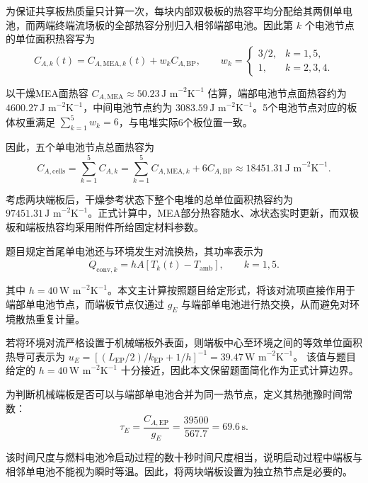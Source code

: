 \documentclass[bwprint]{gmcmthesis}
\numberwithin{figure}{section}
\begin{document}
\begin{itemize}
\noindent 为保证共享板热质量只计算一次，每块内部双极板的热容平均分配给其两侧单电池，而两端终端流场板的全部热容分别归入相邻端部电池。因此第 \(k\) 个电池节点的单位面积热容写为
\begin{equation}
C_{A,k}(t) = C_{A,\text{MEA},k}(t) + w_k C_{A,\text{BP}}, \qquad w_k = \begin{cases} 3/2, & k = 1, 5, \\ 1, & k = 2, 3, 4. \end{cases} \tag{5-20}
\end{equation}

\noindent 以干燥MEA面热容 \(C_{A,\text{MEA}} \approx 50.23 \, \text{J m}^{-2}\text{K}^{-1}\) 估算，端部电池节点面热容约为 \(4600.27 \, \text{J m}^{-2}\text{K}^{-1}\)，中间电池节点约为 \(3083.59 \, \text{J m}^{-2}\text{K}^{-1}\)。5个电池节点对应的板体权重满足 \(\sum_{k=1}^5 w_k =6\)，与电堆实际6个板位置一致。

\noindent 因此，五个单电池节点总面热容为
\begin{equation}
C_{A,\text{cells}} = \sum_{k=1}^5 C_{A,k} = \sum_{k=1}^5 C_{A,\text{MEA},k} + 6C_{A,\text{BP}} \approx 18451.31 \, \text{J m}^{-2}\text{K}^{-1}. \tag{5-21}
\end{equation}

\noindent 考虑两块端板后，干燥参考状态下整个电堆的总单位面积热容约为 \(97451.31 \, \text{J m}^{-2}\text{K}^{-1}\)。正式计算中，MEA部分热容随水、冰状态实时更新，而双极板和端板热容均采用附件所给固定材料参数。

\noindent 题目规定首尾单电池还与环境发生对流换热，其功率表示为
\begin{equation}
\dot{Q}_{\text{conv},k} = hA[T_k(t) - T_{\text{amb}}], \qquad k = 1, 5. \tag{5-22}
\end{equation}

\noindent 其中 \(h = 40 \, \text{W m}^{-2}\text{K}^{-1}\)。本文主计算按照题目给定形式，将该对流项直接作用于端部单电池节点，而端板节点仅通过 \(g_E\) 与端部单电池进行热交换，从而避免对环境散热重复计量。

\noindent 若将环境对流严格设置于机械端板外表面，则端板中心至环境之间的等效单位面积热导可表示为
\(u_E = [(L_{\text{EP}}/2)/k_{\text{EP}} + 1/h]^{-1} = 39.47 \, \text{W m}^{-2}\text{K}^{-1}\)。
该值与题目给定的 \(h = 40 \, \text{W m}^{-2}\text{K}^{-1}\) 十分接近，因此本文保留题面简化作为正式计算边界。

\noindent 为判断机械端板是否可以与端部单电池合并为同一热节点，定义其热弛豫时间常数：
\begin{equation}
\tau_E = \frac{C_{A,\text{EP}}}{g_E} = \frac{39500}{567.7} = 69.6 \, \text{s}. \tag{5-23}
\end{equation}

\noindent 该时间尺度与燃料电池冷启动过程的数十秒时间尺度相当，说明启动过程中端板与相邻单电池不能视为瞬时等温。因此，将两块端板设置为独立热节点是必要的。



\end{itemize}
\end{document}
